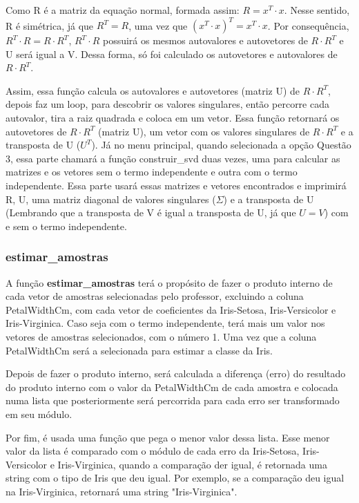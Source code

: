 \documentclass[a4paper,12pt,twoside]{article}
\begin{document}
Como R é a matriz da equação normal, formada assim: $R = x^{T}\cdot x$. Nesse sentido, R é simétrica, já que $R^{T} = R$, uma vez que $(x^{T}\cdot x)^{T} = x^{T}\cdot x$. Por consequência, $R^{T}\cdot R = R\cdot R^{T}$, $R^{T}\cdot R$ possuirá os mesmos autovalores e autovetores de $R\cdot R^{T}$ e U será igual a V. Dessa forma, só foi calculado os autovetores e autovalores de $R\cdot R^{T}$.

Assim, essa função calcula os autovalores e autovetores (matriz U) de $R\cdot R^{T}$, depois faz um loop, para descobrir os valores singulares, então percorre cada  autovalor, tira a raiz quadrada e coloca em um vetor. Essa função retornará os autovetores de $R\cdot R^{T}$ (matriz U), um vetor com os valores singulares de $R\cdot R^{T}$ e a transposta de U ($U^T$). Já no menu principal, quando selecionada a opção Questão 3, essa parte chamará a função construir\_svd duas vezes, uma para calcular as matrizes e os vetores sem  o termo independente e outra com o termo independente. Essa parte usará essas matrizes e vetores encontrados e imprimirá R, U, uma matriz diagonal de valores singulares ($\Sigma$) e a transposta de U (Lembrando que a transposta de V é igual a transposta de U, já que $U = V$) com e sem o termo independente.

\subsubsection{estimar\_amostras}
A função \textbf{estimar\_amostras} terá o propósito de fazer o produto interno de cada vetor de amostras selecionadas pelo professor, excluindo a coluna PetalWidthCm, com cada vetor de coeficientes da Iris-Setosa, Iris-Versicolor e Iris-Virginica. Caso seja com o termo independente, terá mais um valor nos vetores de amostras selecionados, com o número 1. Uma vez que a coluna PetalWidthCm será a selecionada para estimar a classe da Iris. 

Depois de fazer o produto interno, será calculada a diferença (erro) do resultado do produto interno com o valor da PetalWidthCm de cada amostra e colocada numa lista que posteriormente será percorrida para cada erro ser transformado em seu módulo. 

Por fim, é usada uma função que pega o menor valor dessa lista. Esse menor valor da lista é comparado com o módulo de cada erro da Iris-Setosa, Iris-Versicolor e Iris-Virginica, quando a comparação der igual, é retornada uma string com o tipo de Iris que deu igual. Por exemplo, se a comparação deu igual na Iris-Virginica, retornará uma string "Iris-Virginica".
\end{document}
